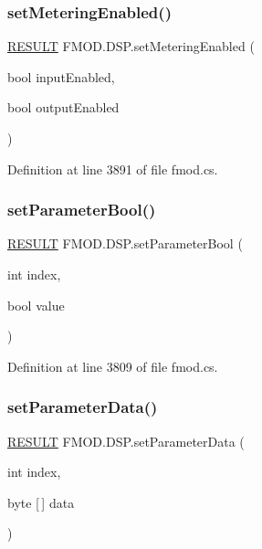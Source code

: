 \subsubsection{\texorpdfstring{set\+Metering\+Enabled()}{setMeteringEnabled()}}
{\footnotesize\ttfamily \hyperlink{namespace_f_m_o_d_a305d1176ef3f8c8815861a60407ac33d}{R\+E\+S\+U\+LT} F\+M\+O\+D.\+D\+S\+P.\+set\+Metering\+Enabled (\begin{DoxyParamCaption}\item[{bool}]{input\+Enabled,  }\item[{bool}]{output\+Enabled }\end{DoxyParamCaption})}



Definition at line 3891 of file fmod.\+cs.

\mbox{\label{class_f_m_o_d_1_1_d_s_p_a3a9e7406668ed5b8a6b3d2d402901741}} 
\subsubsection{\texorpdfstring{set\+Parameter\+Bool()}{setParameterBool()}}
{\footnotesize\ttfamily \hyperlink{namespace_f_m_o_d_a305d1176ef3f8c8815861a60407ac33d}{R\+E\+S\+U\+LT} F\+M\+O\+D.\+D\+S\+P.\+set\+Parameter\+Bool (\begin{DoxyParamCaption}\item[{int}]{index,  }\item[{bool}]{value }\end{DoxyParamCaption})}



Definition at line 3809 of file fmod.\+cs.

\mbox{\label{class_f_m_o_d_1_1_d_s_p_aed93a25cbab0c186134d5725e761315b}} 
\subsubsection{\texorpdfstring{set\+Parameter\+Data()}{setParameterData()}}
{\footnotesize\ttfamily \hyperlink{namespace_f_m_o_d_a305d1176ef3f8c8815861a60407ac33d}{R\+E\+S\+U\+LT} F\+M\+O\+D.\+D\+S\+P.\+set\+Parameter\+Data (\begin{DoxyParamCaption}\item[{int}]{index,  }\item[{byte \mbox{[}$\,$\mbox{]}}]{data }\end{DoxyParamCaption})}




